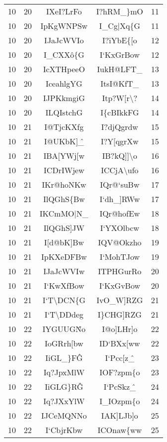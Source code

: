 \begin{longtable}{ | c | c || c | c | c | }
\hline
10 & 20 & IXeI?LrFo & I?hRM\_\}mO & 11 \\
10 & 20 & IpKgWNPSw & I\_Cg|Xq\{G & 11 \\
\hline
10 & 20 & IJaJcWVIo & I?iYbE\{[o & 12 \\
10 & 20 & I\_CXX\^o\{G & I`KxGrBow & 12 \\
\hline
10 & 20 & IcXTHpeeO & IukH@LFT\_ & 13 \\
10 & 20 & IceahlgYG & ItsI@KfT\_ & 13 \\
\hline
10 & 20 & IJPKkmgiG & Itp?W[r\textbackslash ? & 14 \\
10 & 20 & ILQIstchG & I\{cBIkkFG & 14 \\
\hline
\hline
10 & 21 & I@TjcKXfg & I?djQgrdw & 15 \\
10 & 21 & I@UKbK]\^\_ & I?Y[qgrXw & 15 \\
\hline
10 & 21 & IBA[YWj[w & IB?kQ]]\textbackslash o & 16 \\
10 & 21 & ICDrIWjew & ICCjA\textbackslash ufo & 16 \\
\hline
10 & 21 & IKr@hoNKw & IQr@`suBw & 17 \\
10 & 21 & IlQGhS\{Bw & I`dh\_]RWw & 17 \\
\hline
10 & 21 & IKCmMO|N\_ & IQr@hofEw & 18 \\
10 & 21 & IlQGhS]JW & I`YXOlbcw & 18 \\
\hline
10 & 21 & I[d@bK]Bw & IQV@Okzho & 19 \\
10 & 21 & IpKXeDFBw & I`MohTJow & 19 \\
\hline
10 & 21 & IJaJcWVIw & ITPHGurRo & 20 \\
10 & 21 & I`KwXfBow & I`KxGvBow & 20 \\
\hline
10 & 21 & I`T\textbackslash DCN\{G & IvO\_W]RZG & 21 \\
10 & 21 & I`T\textbackslash DDdeg & I\}CHG]RZG & 21 \\
\hline
\hline
10 & 22 & IYGUUG\^No & I@o]LHr]o & 22 \\
10 & 22 & IoGRrh[bw & ID`BXx[ww & 22 \\
\hline
10 & 22 & IiGL\_\}F\^G & I`Pcc[z\^\_ & 23 \\
10 & 22 & Iq?JpxMlW & IOF?zpm\{o & 23 \\
\hline
10 & 22 & IiGLG\}R\^G & I`PcSkz\^\_ & 24 \\
10 & 22 & Iq?JXxYlW & I\_IOzpm\{o & 24 \\
\hline
10 & 22 & IJCeMQNNo & IAK]LJb]o & 25 \\
10 & 22 & I`CbjrKbw & ICOnaw\{ww & 25 \\

\end{longtable}
